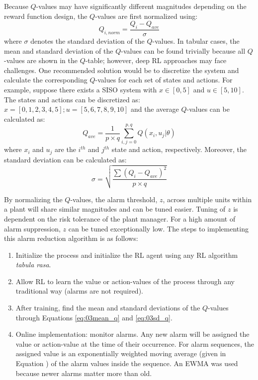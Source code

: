 Because $Q$-values may have significantly different magnitudes depending on the reward function design, the $Q$-values are first normalized using:
\begin{equation}
    Q_{i, norm} = \frac{Q_i - Q_{ave}}{\sigma}
\end{equation}
where $\sigma$ denotes the standard deviation of the $Q$-values.  In tabular cases, the mean and standard deviation of the $Q$-values can be found trivially because all $Q$-values are shown in the $Q$-table; however, deep RL approaches may face challenges.  One recommended solution would be to discretize the system and calculate the corresponding $Q$-values for each set of states and actions.  For example, suppose there exists a SISO system with $x \in [0, 5]$ and $u \in [5, 10]$.  The states and actions can be discretized as: $x = [0, 1, 2, 3, 4, 5]; u = [5, 6, 7, 8, 9, 10]$ and the average $Q$-values can be calculated as:
\begin{equation}
    Q_{ave} = \frac{1}{p \times q} \sum_{i, j = 0}^{p, q} Q(x_i, u_j | \theta)
    \label{eq:03mean_q}
\end{equation}
where $x_i$ and $u_j$ are the $i^{th}$ and $j^{th}$ state and action, respectively. Moreover, the standard deviation can be calculated as:
\begin{equation}
    \sigma = \sqrt{\frac{\sum (Q_i - Q_{ave})^2}{p \times q}}
    \label{eq:03sd_q}
\end{equation}

By normalizing the $Q$-values, the alarm threshold, $z$, across multiple units within a plant will share similar magnitudes and can be tuned easier.  Tuning of $z$ is dependent on the risk tolerance of the plant manager.  For a high amount of alarm suppression, $z$ can be tuned exceptionally low.  The steps to implementing this alarm reduction algorithm is as follows:

\begin{enumerate}
    \item Initialize the process and initialize the RL agent using any RL algorithm \textit{tabula rasa}.
    \item Allow RL to learn the value or action-values of the process through any traditional way (alarms are not required).
    \item After training, find the mean and standard deviations of the $Q$-values through Equations \ref{eq:03mean_q} and \ref{eq:03sd_q}.
    \item Online implementation: monitor alarms.  Any new alarm will be assigned the value or action-value at the time of their occurrence.  For alarm sequences, the assigned value is an exponentially weighted moving average (given in Equation \label{eq:08EWMA}) of the alarm values inside the sequence.  An EWMA was used because newer alarms matter more than old.
\end{enumerate}



